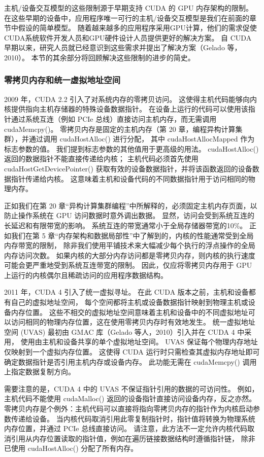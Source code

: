 主机/设备交互模型的这些限制源于早期支持 CUDA 的 GPU 内存架构的限制。 
在这些早期的设备中，应用程序唯一可行的主机/设备交互模型是我们在前面的章节中假设的简单模型。 
随着越来越多的应用程序采用GPU计算，他们的需求促使CUDA系统软件开发人员和GPU硬件设计人员提供更好的解决方案。 
自 CUDA 早期以来，研究人员就已经意识到这些需求并提出了解决方案（Gelado 等，2010）。 
本节的其余部分将回顾解决这些限制的进步的简史。

\subsubsection{零拷贝内存和统一虚拟地址空间}
2009 年，CUDA 2.2 引入了对系统内存的零拷贝访问。 这使得主机代码能够向内核提供指向主机存储器的特殊设备数据指针。 
在设备上运行的代码可以使用该指针通过系统互连（例如 PCIe 总线）直接访问主机内存，而无需调用 cudaMemcpy()。 
零拷贝内存是固定的主机内存（第 20 章，编程异构计算集群），并通过调用 cudaHostAlloc() 进行分配，
其中 cudaHostAllocMapped 作为标志参数的值。 我们提到标志参数的其他值用于更高级的用法。 
cudaHostAlloc()返回的数据指针不能直接传递给内核； 
主机代码必须首先使用 cudaHostGetDevicePointer() 获取有效的设备数据指针，并将该函数返回的设备数据指针传递给内核。 
这意味着主机和设备代码的不同数据指针用于访问相同的物理内存。

正如我们在第 20 章“异构计算集群编程”中所解释的，必须固定主机内存页面，以防止操作系统在 GPU 访问数据时意外调出数据。 
显然，访问会受到系统互连的长延迟和有限带宽的影响。 系统互连的带宽通常小于全局存储器带宽的10\%。 
正如我们在第 5 章“内存架构和数据局部性”中了解到的，内核的性能通常受到全局内存带宽的限制，
除非我们使用平铺技术来大幅减少每个执行的浮点操作的全局内存访问次数。 
如果内核的大部分内存访问都是零拷贝内存，则内核的执行速度可能会更严重地受到系统互连带宽的限制。 
因此，仅应将零拷贝内存用于 GPU 上运行的内核偶尔且稀疏访问的应用程序数据结构。

2011 年，CUDA 4 引入了统一虚拟寻址。 在此 CUDA 版本之前，主机和设备都有自己的虚拟地址空间，
每个空间都将主机或设备数据指针映射到物理主机或设备内存位置。 
这些不相交的虚拟地址空间意味着主机和设备中的不同虚拟地址可以访问相同的物理内存位置，这在使用零拷贝内存时有效地发生。 
统一虚拟地址空间 (UVAS) 最初由 GMAC 库（Gelado 等人，2010）引入并在 CUDA 4 中采用，
使用由主机和设备共享的单个虚拟地址空间。 UVAS 保证每个物理内存地址仅映射到一个虚拟内存位置。 
这使得 CUDA 运行时只需检查其虚拟内存地址即可确定数据指针是否引用主机内存或设备内存。 
此功能无需在 cudaMemcpy() 调用上指定数据复制方向。

需要注意的是，CUDA 4 中的 UVAS 不保证指针引用的数据的可访问性。 
例如，主机代码不能使用 cudaMalloc() 返回的设备指针直接访问设备内存，反之亦然。 
零拷贝内存是个例外：主机代码可以直接将指向零拷贝内存的指针作为内核启动参数传递给设备。 
当内核代码取消引用此零复制指针时，指针值将转换为物理系统内存位置，并通过 PCIe 总线直接访问。 
请注意，此方法不一定允许内核代码取消引用从内存位置读取的指针值，例如在遍历链接数据结构时遵循指针链，
除非已使用 cudaHostAlloc() 分配了所有内存。

